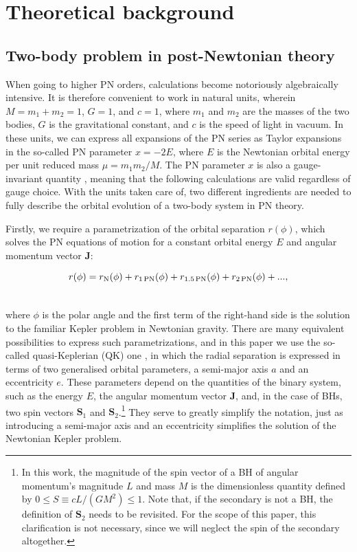 \documentclass[usenatbib]{mnras}
\begin{document}

\section{Theoretical background}\label{sec:methods}

\subsection{Two-body problem in post-Newtonian theory}

When going to higher PN orders, calculations become notoriously algebraically intensive. It is therefore convenient to work in natural units, wherein $M = m_1 + m_2=1$, $G=1$, and $c=1$, where $m_1$ and $m_2$ are the masses of the two bodies, $G$ is the gravitational constant, and $c$ is the speed of light in vacuum. In these units, we can express all expansions of the PN series as Taylor expansions in the so-called PN parameter $x = -2E$, where $E$ is the Newtonian orbital energy per unit reduced mass $\mu = m_1m_2/M$. The PN parameter $x$ is also a gauge-invariant quantity \citep[see, e.g.][]{Blanchet2014}, meaning that the following calculations are valid regardless of gauge choice. With the units taken care of, two different ingredients are needed to fully describe the orbital evolution of a two-body system in PN theory.

Firstly, we require a parametrization of the orbital separation $r(\phi)$, which solves the PN equations of motion for a constant orbital energy $E$ and angular momentum vector $\mathbf{J}$:

\begin{align}
    r(\phi) &= r_{\rm N}(\phi) + r_{\rm{1\,PN}}(\phi) + r_{\rm{1.5\,PN}}(\phi) + r_{\rm{2\,PN}}(\phi) + ...,\\ \nonumber
\end{align}

\noindent where $\phi$ is the polar angle and the first term of the right-hand side is the solution to the familiar Kepler problem in Newtonian gravity. There are many equivalent possibilities to express such parametrizations, and in this paper we use the so-called quasi-Keplerian (QK) one \citep[see][]{1PN_par,2PN_par,Memmesheimer}, in which the radial separation is expressed in terms of  two generalised orbital parameters, a semi-major axis $a$ and an eccentricity $e$. These parameters depend on the quantities of the binary system, such as the energy $E$, the angular momentum vector $\mathbf{J}$, and, in the case of BHs, two spin vectors $\mathbf{S}_1$ and $\mathbf{S}_2$.\footnote{In this work, the magnitude of the spin vector of a BH of angular momentum's magnitude $L$ and mass $M$ is the dimensionless quantity defined by $0 \leq S \equiv c L /(G M^2) \leq 1$. Note that, if the secondary is not a BH, the definition of $\mathbf{S}_2$ needs to be revisited. For the scope of this paper, this clarification is not necessary, since we will neglect the spin of the secondary altogether.} They serve to greatly simplify the notation, just as introducing a semi-major axis and an eccentricity simplifies the solution of the Newtonian Kepler problem.
\end{document}
